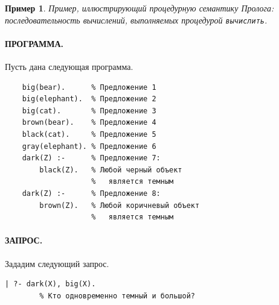 \documentclass[12pt, openany, twoside]{book} %
\newtheorem{example}{Пример}[chapter]
\begin{document}
\begin{example}\label{ex:bear}
Пример, иллюстрирующий процедурную семантику Пролога: последовательность вычислений, выполняемых процедурой {\tt вычислить}.
\end{example}\label{ex:interp}
\paragraph{ПРОГРАММА.} Пусть дана следующая программа.
{\tt\begin{verbatim}
    big(bear).      % Предложение 1
    big(elephant).  % Предложение 2
    big(cat).       % Предложение 3
    brown(bear).    % Предложение 4
    black(cat).     % Предложение 5
    gray(elephant). % Предложение 6
    dark(Z) :-      % Предложение 7:
        black(Z).   % Любой черный объект
                    %   является темным
    dark(Z) :-      % Предложение 8:
        brown(Z).   % Любой коричневый объект
                    %   является темным
\end{verbatim}}

\paragraph{ЗАПРОС.} Зададим следующий запрос.
{\tt\begin{verbatim}
| ?- dark(X), big(X).
        % Кто одновременно темный и большой?
\end{verbatim}}
\end{document}
